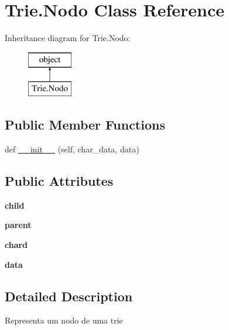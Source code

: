 \hypertarget{class_trie_1_1_nodo}{}\section{Trie.\+Nodo Class Reference}
\label{class_trie_1_1_nodo}
Inheritance diagram for Trie.\+Nodo\+:\begin{figure}[H]
\begin{center}
\leavevmode
\includegraphics[height=2.000000cm]{class_trie_1_1_nodo}
\end{center}
\end{figure}
\subsection*{Public Member Functions}
\begin{DoxyCompactItemize}
\item 
def \mbox{\hyperlink{class_trie_1_1_nodo_a14edf9313e0cb711a55c47d8250b566b}{\+\_\+\+\_\+init\+\_\+\+\_\+}} (self, char\+\_\+data, data)
\end{DoxyCompactItemize}
\subsection*{Public Attributes}
\begin{DoxyCompactItemize}
\item 
\mbox{\label{class_trie_1_1_nodo_a4d02f803001c14b673ec515096536cf5}} 
{\bfseries child}
\item 
\mbox{\label{class_trie_1_1_nodo_a554b24962e680d0641df132499788c01}} 
{\bfseries parent}
\item 
\mbox{\label{class_trie_1_1_nodo_ac3ea66bba593e72a8b0db4b7b70c48a9}} 
{\bfseries chard}
\item 
\mbox{\label{class_trie_1_1_nodo_ad96070f8122b253194611b8f8b0d4e86}} 
{\bfseries data}
\end{DoxyCompactItemize}


\subsection{Detailed Description}
\begin{DoxyVerb}Representa um nodo de uma trie\end{DoxyVerb}
 

